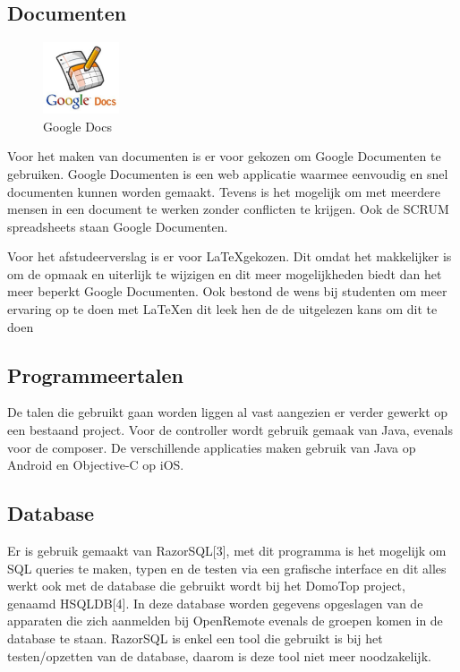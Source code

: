 \documentclass[]{article}
\begin{document}
\subsection{Documenten}

\begin{figure}
  \begin{center}
    \includegraphics[width=0.20\textwidth]{docs.pdf}
  \end{center}
  \caption{Google Docs}
\end{figure}
Voor het maken van documenten is er voor gekozen om Google Documenten te
gebruiken. Google Documenten is een web applicatie waarmee eenvoudig en
snel documenten kunnen worden gemaakt. Tevens is het mogelijk om met
meerdere mensen in een document te werken zonder conflicten te krijgen. Ook
de SCRUM spreadsheets staan Google Documenten.

Voor het afstudeerverslag is er voor \LaTeX  gekozen. Dit omdat het
makkelijker is om de opmaak en uiterlijk te wijzigen en dit meer mogelijkheden
biedt dan het meer beperkt Google Documenten. Ook bestond de wens bij studenten
om meer ervaring op te doen met \LaTeX  en dit leek hen de de uitgelezen kans om
dit te doen

\subsection{Programmeertalen}
De talen die gebruikt gaan worden liggen al vast aangezien er verder 
gewerkt op een bestaand project. Voor de controller wordt gebruik gemaak van
Java, evenals voor de composer. De verschillende applicaties maken gebruik
van Java op Android en Objective-C op iOS.

\newpage
\subsection{Database}
Er is gebruik gemaakt van RazorSQL[3], met dit programma is het mogelijk om
SQL queries te maken, typen en de testen via een grafische interface en dit
alles werkt ook met de database die gebruikt wordt bij het DomoTop project,
genaamd HSQLDB[4]. In deze database worden gegevens opgeslagen van de
apparaten die zich aanmelden bij OpenRemote evenals de groepen komen in de
database te staan.  RazorSQL is enkel een tool die gebruikt is bij het
testen/opzetten van de database, daarom is deze tool niet meer
noodzakelijk.
\end{document}
